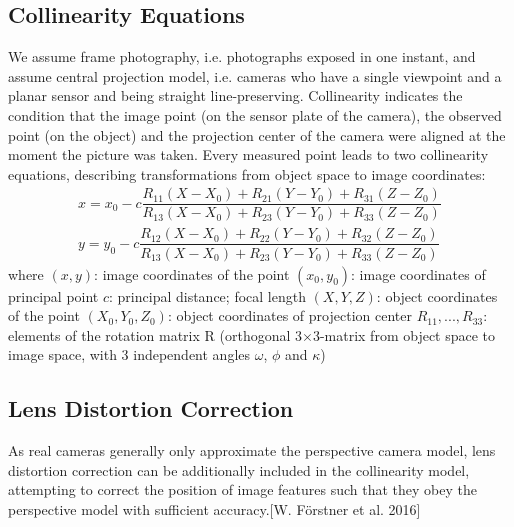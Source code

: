 \subsection{Collinearity Equations}
\label{subsec:Collinearity}
We assume frame photography, i.e. photographs exposed in one instant, and assume central projection model, i.e. cameras who have a single viewpoint and a planar sensor and being straight line-preserving. Collinearity indicates the condition that the image point (on the sensor plate of the camera), the observed point (on the object) and the projection center of the camera were aligned at the moment the picture was taken. Every measured point leads to two collinearity equations, describing transformations from object space to image coordinates:
\begin{equation} \label{eq:collinearity}
\begin{split}
x = x_0 -c \dfrac {R_{11}(X-X_0) + R_{21}(Y-Y_0) + R_{31}(Z-Z_0)} {R_{13}(X-X_0) + R_{23}(Y-Y_0) + R_{33}(Z-Z_0)} \\
y = y_0 -c \dfrac {R_{12}(X-X_0) + R_{22}(Y-Y_0) + R_{32}(Z-Z_0)} {R_{13}(X-X_0) + R_{23}(Y-Y_0) + R_{33}(Z-Z_0)}
\end{split}
\end{equation}
where\newline
$(x, y)$: image coordinates of the point \newline
$(x_0, y_0)$: image coordinates of principal point \newline
$c$: principal distance; focal length \newline
$(X, Y, Z)$: object coordinates of the point \newline
$(X_0, Y_0, Z_0)$: object coordinates of projection center \newline
$R_{11},...,R_{33}$: elements of the rotation matrix R (orthogonal 3$\times$3-matrix from object space to image space, with 3 independent angles $\omega$, $\phi$ and $\kappa$)

\subsection{Lens Distortion Correction}
\label{subsec:LensDistortion}

As real cameras generally only approximate the perspective camera model, lens distortion correction can be additionally included in the collinearity model, attempting to correct the position of image features such that they obey the perspective model with sufficient accuracy.[W. Förstner et al. 2016] 

